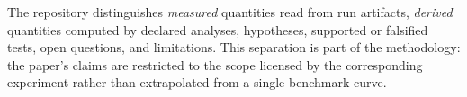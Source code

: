The repository distinguishes \emph{measured} quantities read from run artifacts, \emph{derived} quantities computed by declared analyses, hypotheses, supported or falsified tests, open questions, and limitations. This separation is part of the methodology: the paper's claims are restricted to the scope licensed by the corresponding experiment rather than extrapolated from a single benchmark curve.
